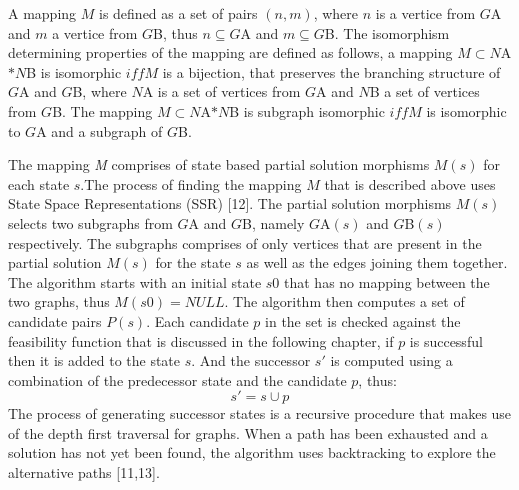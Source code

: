 A mapping $M$ is defined as a set of pairs $(n,m)$, where $n$ is a vertice from $G${\tiny A} and $m$ a vertice from $G${\tiny B}, thus $n \subseteq G${\tiny A} and $m \subseteq G${\tiny B}.\newline\newline
The isomorphism determining properties of the mapping are defined as follows, a mapping $M \subset N${\tiny A} $ * N${\tiny B} is isomorphic $iff M$ is a bijection, that preserves the branching structure of $G${\tiny A} and $G${\tiny B}, where $N${\tiny A} is a set of vertices from $G${\tiny A} and $N${\tiny B} a set of vertices from $G${\tiny B}.\newline\newline
The mapping $M \subset N${\tiny A}$ * N${\tiny B} is subgraph isomorphic $iff M$ is isomorphic to $G${\tiny A} and a subgraph of $G${\tiny B}.

The mapping \textit{M} comprises of state based partial solution morphisms $M(s)$ for each state $s$.The process of finding the mapping $M$ that is described above uses State Space Representations (SSR) [12].
The partial solution morphisms $M(s)$ selects two subgraphs from $G${\tiny A} and $G${\tiny B}, namely $G${\tiny A}$(s)$ and $G${\tiny B}$(s)$ respectively. The subgraphs comprises of only vertices that are present in the partial solution $M(s)$ for the state $s$ as well as the edges joining them together.\newline\newline
The algorithm starts with an initial state $s0$ that has no mapping between the two graphs, thus $M(s0)= NULL$. The algorithm then computes a set of candidate pairs $P(s)$. Each candidate $p$ in the set is checked against the feasibility function that is discussed in the following chapter, if $p$ is successful then it is added to the state $s$. And the successor $s'$ is computed using a combination of the predecessor state and the candidate $p$, thus:
      \begin{equation}
	      s' = s \cup p
      \end{equation}
The process of generating successor states is a recursive procedure that makes use of the depth first traversal for graphs. When a path has been 
exhausted and a solution has not yet been found, the algorithm uses backtracking to explore the alternative paths [11,13]. \newpage


